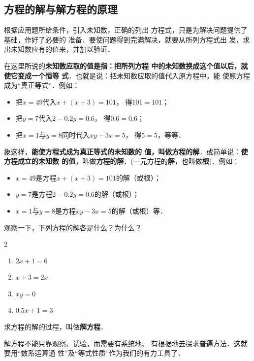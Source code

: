 \subsection{方程的解与解方程的原理}
    根据应用题所给条件，引入未知数，正确的列出
方程式，只是为解决问题提供了基础，作好了必要的
准备．要使问题得到完满解决，就要从所列方程式出
发，求出未知数应有的值来，并加以验证．

    在这里所说的\textbf{未知数应取的值是指：把所列方程
中的未知数换成这个值以后，就使它变成一个恒等
式}．也就是说：把未知数应取的值代入原方程中，能
使原方程成为“真正等式”．例如：
\begin{itemize}
    \item 把$x = 49$代入$x+ (x+3)=101$，    得$101=101$；
    \item 把$y=7$代入$2-0.2y=0.6$，    得$0 .6=0. 6$；
    \item 把$x=1$与$y=8$同时代入$xy-3x=5$，    得$5=5$，等等．
\end{itemize}
  
象这样，\textbf{能使方程式成为真正等式的未知数的
值，叫做方程的解}．或简单说：\textbf{使方程成立的未知数
的值}，叫做\textbf{方程的解}．(一元方程的\textbf{解}，也叫做\textbf{根})．例如：
\begin{itemize}
    \item $x = 49$是方程$x+ (x+3)=101$的解（或根）；
    \item $y=7$是方程$2-0.2y=0.6$的解（或根）；
    \item $x=1$与$y=8$是方程$xy-3x=5$的解（或根）等．
\end{itemize}


\begin{ex}
    观察一下，下列方程的解各是什么？为什么？
    \begin{multicols}{2}
        \begin{enumerate}
 \item \quad$2x+1=6$
 \item \quad$x+3=2x$
 \item \quad$xy=0$
 \item \quad$0.5x+1=3$           
        \end{enumerate}
    \end{multicols}
\end{ex}

求方程的解的过程，叫做\textbf{解方程}．

解方程不能只靠观察、试验，而需要有系统地、
有根据地去探求普遍方法．这就要用“数系运算通
性”及“等式性质”作为我们的有力工具了．


